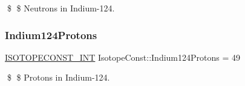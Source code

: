 \$ \$ Neutrons in Indium-\/124. \mbox{\label{group___isotope_const-_indium-_in124_ga2fabbe7e42008bd98f57fda4f7880ef3}} 
\subsubsection{\texorpdfstring{Indium124\+Protons}{Indium124Protons}}
{\footnotesize\ttfamily \mbox{\hyperlink{group___isotope_const-_macros_ga5f18360b3e99483a35c32d789e62621c}{I\+S\+O\+T\+O\+P\+E\+C\+O\+N\+S\+T\+\_\+\+I\+NT}} Isotope\+Const\+::\+Indium124\+Protons = 49}

\$ \$ Protons in Indium-\/124. 